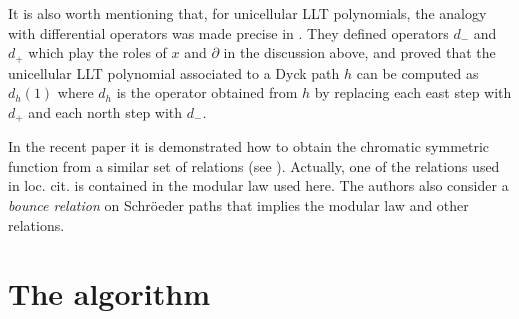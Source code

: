 \documentclass[10pt]{amsart}
\theoremstyle{definition}
\newcommand{\A}{\mathcal A}
\newcommand{\col}{\colon}
\newcommand{\D}{\mathcal{D}}
\begin{document}
      It is also worth mentioning that, for unicellular LLT polynomials, the analogy with differential operators was made precise in \cite{CarlssonMellit}. They defined operators $d_{-}$ and $d_{+}$ which play the roles of $x$ and $\partial$ in the discussion above, and proved that the unicellular LLT polynomial associated to a Dyck path $h$ can be computed as $d_h(1)$ where $d_h$ is the operator obtained from $h$ by replacing each east step with $d_{+}$ and each north step with $d_{-}$.\par


      In the recent paper \cite{AS2020} it is demonstrated how to obtain the chromatic symmetric function from a similar set of relations (see \cite[Corollary 6.16]{AS2020}). Actually, one of the relations used in loc. cit. is contained in the modular law used here. The authors also consider a \emph{bounce relation} on Schr\"oeder paths that implies the modular law and other relations.\par

      








\section{The algorithm}
\end{document}
